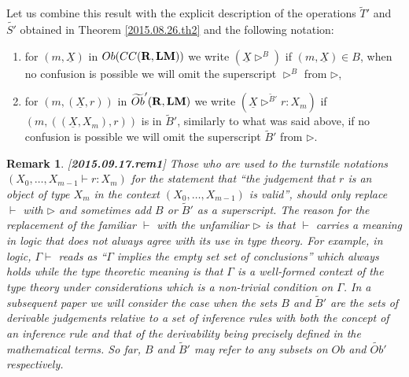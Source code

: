 \documentclass[11pt]{article}
\newtheorem{remark}[proposition]{Remark}
\newcommand{\llabel}[1]{\label{#1}[{\bf #1}]}
\newcommand{\rr}{{\bf R}}
\newcommand{\lm}{{\bf LM}}
\newcommand{\uu}{\underline}
\newcommand{\wt}{\widetilde}
\begin{document}
Let us combine this result with the explicit description of the operations $\wt{T}'$ and $\wt{S'}$ obtained in Theorem \ref{2015.08.26.th2} and the following notation:
%
\begin{enumerate}
\item for $(m,\uu{X})$ in $Ob(CC(\rr,\lm))$ we write $(\uu{X}\rhd^{B})$ if $(m,\uu{X})\in B$, when no confusion is possible we will omit the superscript $\rhd^{B}$ from $\rhd$,
\item for $(m,(\uu{X},r))$ in $\wt{Ob}'(\rr,\lm)$ we write $(\uu{X}\rhd^{\wt{B}'} r:X_m)$ if $(m,((\uu{X},X_m),r))$ is in $\wt{B}'$, similarly to what was said above, if no confusion is possible we will omit the superscript $\wt{B}'$ from $\rhd$. 
\end{enumerate}
%
\begin{remark}\rm\llabel{2015.09.17.rem1}
Those who are used to the turnstile notations $(X_0,\dots,X_{m-1}\vdash r:X_m)$ for the statement that ``the judgement that $r$ is an object of type $X_m$ in the context $(X_0,\dots,X_{m-1})$  is valid'', should only replace $\vdash$ with $\rhd$ and sometimes add $B$ or $\wt{B}'$ as a superscript. The reason for the replacement of the familiar $\vdash$ with the unfamiliar $\rhd$ is that $\vdash$ carries a meaning in logic that does not always agree with its use in type theory. For example, in logic, $\Gamma\vdash$ reads as ``$\Gamma$ implies the empty set set of conclusions'' which always holds while the type theoretic meaning is that $\Gamma$ is a well-formed context of the type theory under considerations which is a non-trivial condition on $\Gamma$. In a subsequent paper we will consider the case when the sets $B$ and $\wt{B}'$ are the sets of derivable judgements relative to a set of inference rules with both the concept of an inference rule and that of the derivability being precisely defined in the mathematical terms. So far, $B$ and $\wt{B}'$ may refer to any subsets on $Ob$ and $\wt{Ob}'$ respectively. 
\end{remark}
\end{document}
